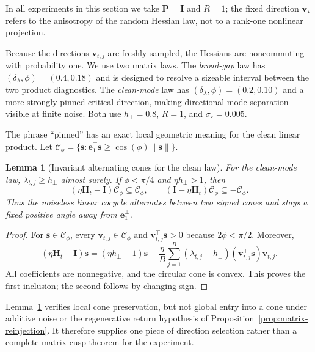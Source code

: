 \documentclass[11pt]{article}
\newtheorem{lemma}[theorem]{Lemma}
\theoremstyle{definition}
\newcommand{\Id}{\mathbf I}
\newcommand{\svec}{\mathbf s}
\newcommand{\vvec}{\mathbf v}
\newcommand{\Hvec}{\mathbf H}
\newcommand{\Pvec}{\mathbf P}
\begin{document}
In all experiments in this section we take $\Pvec=\Id$ and $R=1$; the fixed
direction $\vvec_\star$ refers to the anisotropy of the random Hessian law,
not to a rank-one nonlinear projection.

Because the directions $\vvec_{t,j}$ are freshly sampled, the Hessians are
noncommuting with probability one.  We use two matrix laws.  The
\emph{broad-gap} law has $(\delta_\lambda,\phi)=(0.4,0.18)$ and is designed
to resolve a sizeable interval between the two product diagnostics.  The
\emph{clean-mode} law has $(\delta_\lambda,\phi)=(0.2,0.10)$ and a more
strongly pinned critical direction, making directional mode separation
visible at finite noise.  Both use $h_\perp=0.8$, $R=1$, and
$\sigma_\varepsilon=0.005$.

The phrase ``pinned'' has an exact local geometric meaning for the clean
linear product.  Let
$\mathcal C_\phi=\{\svec:\mathbf e_1^\top\svec\geq
\cos(\phi)\|\svec\|\}$.

\begin{lemma}[Invariant alternating cones for the clean law]
\label{lem:clean-cone}
For the clean-mode law, $\lambda_{t,j}\geq h_\perp$ almost surely.  If
$\phi<\pi/4$ and $\eta h_\perp>1$, then
\begin{equation}
 (\eta\Hvec_t-\Id)\mathcal C_\phi\subseteq\mathcal C_\phi,
 \qquad
 (\Id-\eta\Hvec_t)\mathcal C_\phi\subseteq-\mathcal C_\phi.
 \label{eq:clean-invariant-cones}
\end{equation}
Thus the noiseless linear cocycle alternates between two signed cones and
stays a fixed positive angle away from $\mathbf e_1^\perp$.
\end{lemma}

\begin{proof}
For $\svec\in\mathcal C_\phi$, every
$\vvec_{t,j}\in\mathcal C_\phi$ and
$\vvec_{t,j}^\top\svec>0$ because $2\phi<\pi/2$.  Moreover,
\begin{equation}
 (\eta\Hvec_t-\Id)\svec
 =(\eta h_\perp-1)\svec
 +\frac{\eta}{B}\sum_{j=1}^B
 (\lambda_{t,j}-h_\perp)
 (\vvec_{t,j}^\top\svec)\vvec_{t,j}.
 \label{eq:clean-cone-decomposition}
\end{equation}
All coefficients are nonnegative, and the circular cone is convex.  This
proves the first inclusion; the second follows by changing sign.
\end{proof}

Lemma~\ref{lem:clean-cone} verifies local cone preservation, but not global
entry into a cone under additive noise or the regenerative return hypothesis
of Proposition~\ref{prop:matrix-reinjection}.  It therefore supplies one
piece of direction selection rather than a complete matrix cusp theorem for
the experiment.
\end{document}
